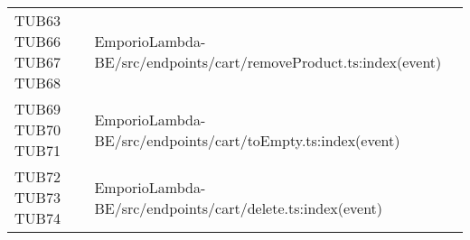{\begin{longtable}{C{2cm} C{12.8cm}}
TUB63 \newline TUB66 \newline TUB67 \newline TUB68 & EmporioLambda-BE/src/endpoints/cart/removeProduct.ts:index(event)\\

TUB69 \newline TUB70 \newline TUB71 & EmporioLambda-BE/src/endpoints/cart/toEmpty.ts:index(event)\\

TUB72 \newline TUB73 \newline TUB74 & EmporioLambda-BE/src/endpoints/cart/delete.ts:index(event)\\




\end{longtable}

}

